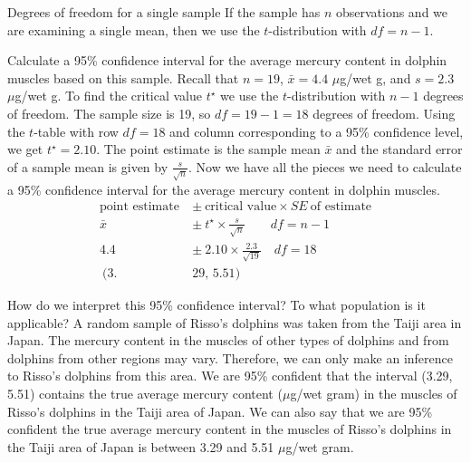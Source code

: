 \begin{onebox}{Degrees of freedom for a single sample}
If the sample has $n$ observations and we are examining a single mean, then we use the \mbox{$t$-distribution} with $df=n-1$.
\end{onebox}

\begin{examplewrap}
\begin{nexample}
{Calculate a 95\% confidence interval for the average mercury content in dolphin muscles based on this sample. Recall that $n=19$, $\bar{x}=4.4$ $\mu$g/wet g, and $s=2.3$ $\mu$g/wet g.  }
To find the critical value $t^{\star}$ we use the $t$-distribution with $n-1$ degrees of freedom.  The sample size is 19, so $df=19-1=18$ degrees of freedom.  Using the $t$-table with row $df=18$ and column corresponding to a 95\% confidence level, we get $t^{\star}=2.10$.  The point estimate is the sample mean $\bar{x}$ and the standard error of a sample mean is given by $\frac{s}{\sqrt{n}}$.  Now we have all the pieces we need to calculate a 95\% confidence interval for the average mercury content in dolphin muscles.  
\begin{align*}
\text{point estimate} \ &\pm\  \text{critical value} \times SE \ \text{of estimate} \\
\bar{x} \ &\pm\  t^{\star}\times \frac{s}{\sqrt{n}} \qquad df=n-1\\
4.4 \ &\pm\  2.10 \times  \frac{2.3}{\sqrt{19}} \quad df=18 \\
 \ (3.&29 \text{, } 5.51)
\end{align*}

\end{nexample}
\end{examplewrap}

\begin{examplewrap}
\begin{nexample}
{How do we interpret this 95\% confidence interval?  To what population is it applicable?}
A random sample of Risso's dolphins was taken from the Taiji area in Japan.  The mercury content in the muscles of other types of dolphins and from dolphins from other regions may vary.  Therefore, we can only make an inference to Risso's dolphins from this area.  We are 95\% confident that the interval (3.29, 5.51) contains the true average mercury content ($\mu$g/wet gram) in the muscles of Risso's dolphins in the Taiji area of Japan.  We can also say that we are 95\% confident the true average mercury content in the muscles of Risso's dolphins in the Taiji area of Japan is between 3.29 and 5.51 $\mu$g/wet gram. 

\end{nexample}
\end{examplewrap}


